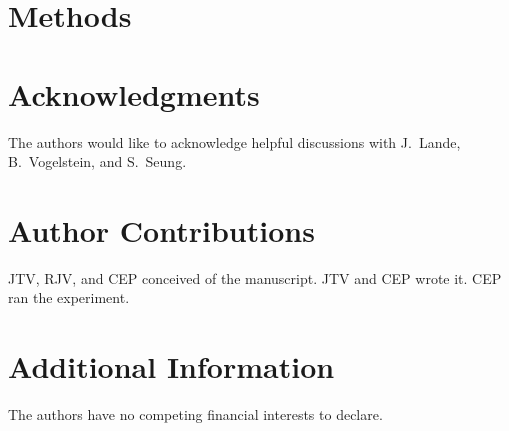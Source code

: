 \documentclass{article}
\newcommand{\hL}{\widehat{L}}
\begin{document}
\section*{Methods}
\label{sec:methods}









\clearpage



\section*{Acknowledgments}

The authors would like to acknowledge helpful discussions with J.~Lande, B.~Vogelstein, and S.~Seung. 

\section*{Author Contributions}

JTV, RJV, and CEP conceived of the manuscript.  JTV and CEP wrote it.  CEP ran the experiment.

\section*{Additional Information}

The authors have no competing financial interests to declare.
\end{document}
